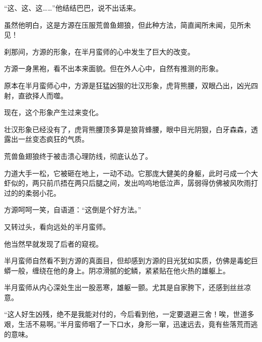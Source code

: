 \begin{this_body}
“这、这、这……”他结结巴巴，说不出话来。

虽然他明白，这是方源在压服荒兽鱼翅狼，但此种方法，简直闻所未闻，见所未见！

刹那间，方源的形象，在半月蛮师的心中发生了巨大的改变。

方源一身黑袍，看不出本来面貌。但在外人心中，自然有推测的形象。

原本在半月蛮师心中，方源是狂猛凶狠的壮汉形象，虎背熊腰，双眼凸出，凶光四射，直欲择人而噬。

现在，这个形象产生过来变化。

壮汉形象已经没有了，虎背熊腰顶多算是狼背蜂腰，眼中目光阴狠，白牙森森，透露出一丝变态疯狂的气质。

荒兽鱼翅狼终于被击溃心理防线，彻底认怂了。

力道大手一松，它被砸在地上，一动不动。它那庞大健美的身躯，此时弓成一个大虾似的，两只前爪捂在两只后腿之间，发出呜呜地低泣声，孱弱得仿佛被风吹雨打过的的柔弱小花。

方源呵呵一笑，自语道：“这倒是个好方法。”

又转过头，看向远处的半月蛮师。

他当然早就发现了后者的窥视。

半月蛮师自然看不到方源的真面目，但却感到方源的目光犹如实质，仿佛是毒蛇巨蟒一般，缠绕在他的身上。阴凉滑腻的蛇鳞，紧紧贴在他火热的雄躯上。

半月蛮师从内心深处生出一股恶寒，雄躯一颤。尤其是自家胯下，还感到丝丝凉意。

“这人好生凶残，绝不是我能对付的，今后看到他，一定要退避三舍！唉，世道多艰，生活不易啊。”半月蛮师咽了一下口水，身形一窜，迅速远去，竟有些落荒而逃的意味。

\end{this_body}

